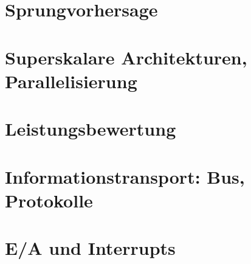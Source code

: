\chapter{Sprungvorhersage}

\chapter{Superskalare Architekturen, Parallelisierung}

\chapter{Leistungsbewertung}

\chapter{Informationstransport: Bus, Protokolle}

\chapter{E/A und Interrupts}



